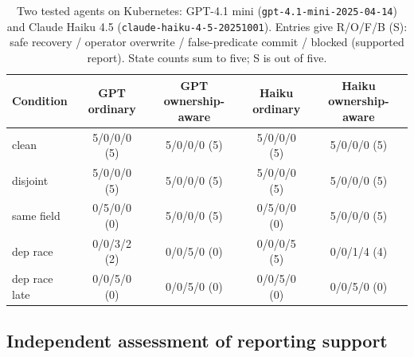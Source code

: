 \documentclass[conference,10pt]{IEEEtran}
\begin{document}
\begin{table}[!t]

\caption{Two tested agents on Kubernetes: GPT-4.1 mini (\textnormal{\texttt{\mbox{gpt-}\discretionary{}{}{}\mbox{4.1-}\discretionary{}{}{}\mbox{mini-}\discretionary{}{}{}\mbox{2025-04-14}}}) and Claude Haiku 4.5 (\textnormal{\texttt{\mbox{claude-}\discretionary{}{}{}\mbox{haiku-}\discretionary{}{}{}\mbox{4-5-}\discretionary{}{}{}\mbox{20251001}}}). Entries give R/O/F/B (S): safe recovery / operator overwrite / false\hyp{}predicate commit / blocked (supported report). State counts sum to five; S is out of five.}

\label{tab:6}

\centering\footnotesize

\setlength{\tabcolsep}{3pt}

\renewcommand{\arraystretch}{1.12}

\begin{tabular}{@{}lcccc@{}}

\toprule

Condition & \shortstack{GPT\\ordinary} & \shortstack{GPT\\ownership\hyp{}aware} & \shortstack{Haiku\\ordinary} & \shortstack{Haiku\\ownership\hyp{}aware} \\

\midrule

clean & 5/0/0/0 (5) & 5/0/0/0 (5) & 5/0/0/0 (5) & 5/0/0/0 (5) \\

disjoint & 5/0/0/0 (5) & 5/0/0/0 (5) & 5/0/0/0 (5) & 5/0/0/0 (5) \\

same field & 0/5/0/0 (0) & 5/0/0/0 (5) & 0/5/0/0 (0) & 5/0/0/0 (5) \\

dep race & 0/0/3/2 (2) & 0/0/5/0 (0) & 0/0/0/5 (5) & 0/0/1/4 (4) \\

dep race late & 0/0/5/0 (0) & 0/0/5/0 (0) & 0/0/5/0 (0) & 0/0/5/0 (0) \\

\bottomrule

\end{tabular}

\end{table}

\subsection{Independent assessment of reporting support}
\end{document}
